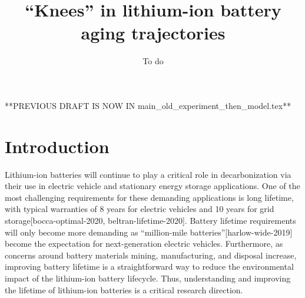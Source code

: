 \documentclass[journal=jpcl, manuscript=article, layout=onecolumn]{achemso}
\title{``Knees'' in lithium-ion battery aging trajectories}
\author{To do}
\date{}
\begin{document}
\maketitle

**PREVIOUS DRAFT IS NOW IN main\_old\_experiment\_then\_model.tex**

\section{Introduction}

Lithium-ion batteries will continue to play a critical role in decarbonization via their use in electric vehicle and stationary energy storage applications. One of the most challenging requirements for these demanding applications is long lifetime, with typical warranties of 8 years for electric vehicles and 10 years for grid storage\cite{hesse_lithium-ion_2017}[bocca-optimal-2020, beltran-lifetime-2020]. Battery lifetime requirements will only become more demanding as “million-mile batteries”[harlow-wide-2019] become the expectation for next-generation electric vehicles. Furthermore, as concerns around battery materials mining, manufacturing, and disposal increase, improving battery lifetime is a straightforward way to reduce the environmental impact of the lithium-ion battery lifecycle. Thus, understanding and improving the lifetime of lithium-ion batteries is a critical research direction.
\end{document}
